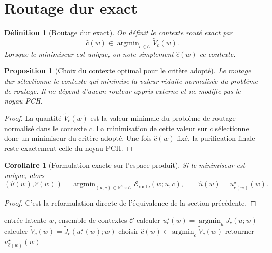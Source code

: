 \documentclass[11pt,a4paper]{article}
\newtheorem{definition}{Définition}[section]
\newtheorem{proposition}{Proposition}[section]
\newtheorem{corollary}{Corollaire}[section]
\DeclareMathOperator{\argmin}{argmin}
\newcommand{\R}{\mathbb R}
\newcommand{\Ccal}{\mathcal C}
\begin{document}
\section{Routage dur exact}

\begin{definition}[Routage dur exact]
On définit le contexte routé exact par
\[
\hat c(w)\in\argmin_{c\in\Ccal}\widetilde V_c(w).
\]
Lorsque le minimiseur est unique, on note simplement \(\hat c(w)\) ce contexte.
\end{definition}

\begin{proposition}[Choix du contexte optimal pour le critère adopté]
Le routage dur sélectionne le contexte qui minimise la valeur réduite normalisée du problème de routage. Il ne dépend d'aucun routeur appris externe et ne modifie pas le noyau PCH.
\end{proposition}

\begin{proof}
La quantité \(\widetilde V_c(w)\) est la valeur minimale du problème de routage normalisé dans le contexte \(c\). La minimisation de cette valeur sur \(c\) sélectionne donc un minimiseur du critère adopté. Une fois \(\hat c(w)\) fixé, la purification finale reste exactement celle du noyau PCH.
\end{proof}

\begin{corollary}[Formulation exacte sur l'espace produit]
Si le minimiseur est unique, alors
\[
(\hat u(w),\hat c(w))
=
\argmin_{(u,c)\in\R^d\times\Ccal}\mathcal E_{\mathrm{route}}(w;u,c),
\qquad
\hat u(w)=u_{\hat c(w)}^\star(w).
\]
\end{corollary}

\begin{proof}
C'est la reformulation directe de l'équivalence de la section précédente.
\end{proof}

\begin{algorithm}[h]
\caption{Routage dur variationnel PCH}
\begin{algorithmic}[1]
\REQUIRE entrée latente \(w\), ensemble de contextes \(\Ccal\)
\FOR{chaque contexte \(c\in\Ccal\)}
    \STATE calculer \(u_c^\star(w)=\argmin_u J_c(u;w)\)
    \STATE calculer \(\widetilde V_c(w)=\widetilde J_c(u_c^\star(w);w)\)
\ENDFOR
\STATE choisir \(\hat c(w)\in\argmin_c \widetilde V_c(w)\)
\STATE retourner \(u^\star_{\hat c(w)}(w)\)
\end{algorithmic}
\end{algorithm}
\end{document}

